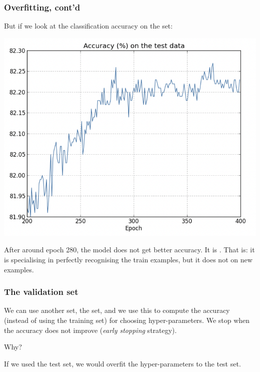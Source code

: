\documentclass[usenames,dvipsnames]{beamer}
\begin{document}
\begin{frame}
\frametitle{Overfitting, cont'd}

But if we look at the classification accuracy on the  set:

\begin{center}
\includegraphics[scale=.3]{accuracy-test}
\end{center}

After around epoch 280, the model does not get better accuracy. It is . That is: it is specialising in perfectly recognising the train examples, but it does not  on new examples.
	
\end{frame}



\begin{frame}
  \frametitle{The validation set}
  
  We can use another set, the  set, and we use this to compute the accuracy (instead of using the training set) for choosing hyper-parameters. We stop when the accuracy does not improve (\emph{early stopping} strategy).
  
  \medskip
  
  Why?
  
  \medskip \pause
  
  If we used the test set, we would overfit the hyper-parameters to the test set.
  
\end{frame}
\end{document}
